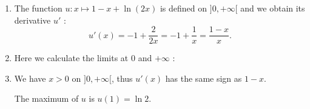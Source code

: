 \begin{enumerate}
\item 
The function $u: x \mapsto 1-x + \ln (2x)$ is defined on $]0,+\infty[$ and we obtain 
its derivative $u'$ :
\[u'(x)=-1+\frac{2}{2x}=-1+\frac{1}{x}=\frac{1-x}{x}. \]

\item 
Here we calculate the limits at 0 and $+\infty$ :

\item 
We have $x >0$ on $]0,+\infty[$, thus $u'(x)$ has the same sign as $1-x$.

The maximum of $u$ is $u(1)=\ln2$.

\end{enumerate}
